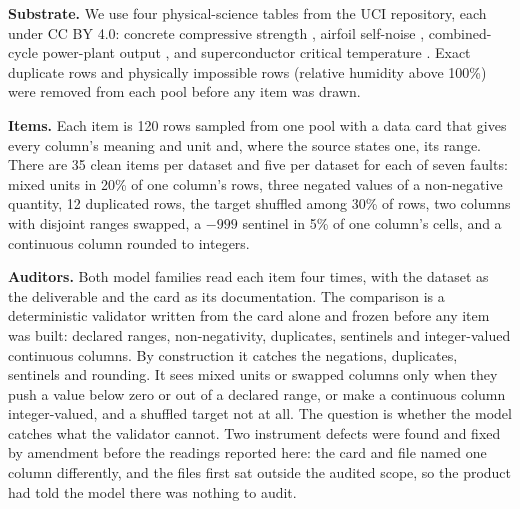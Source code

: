 \textbf{Substrate.} We use four physical-science tables from the UCI repository, each under CC BY 4.0:
concrete compressive strength \citep{yeh1998concrete}, airfoil self-noise
\citep{brooks1989airfoil}, combined-cycle power-plant output \citep{tufekci2014ccpp}, and
superconductor critical temperature \citep{hamidieh2018superconductor}. Exact duplicate rows and
physically impossible rows (relative humidity above 100\%) were removed from each pool before any
item was drawn.

\textbf{Items.} Each item is 120 rows sampled from one pool with a data card that gives every
column's meaning and unit and, where the source states one, its range. There are 35 clean items
per dataset and five per dataset for each of seven faults: mixed units in 20\% of one column's
rows, three negated values of a non-negative quantity, 12 duplicated rows, the target shuffled
among 30\% of rows, two columns with disjoint ranges swapped, a $-999$ sentinel in 5\% of one
column's cells, and a continuous column rounded to integers.

\textbf{Auditors.} Both model families read each item four times, with the dataset as the
deliverable and the card as its documentation. The comparison is a deterministic validator written
from the card alone and frozen before any item was built: declared ranges, non-negativity,
duplicates, sentinels and integer-valued continuous columns. By construction it catches the
negations, duplicates, sentinels and rounding. It sees mixed units or swapped columns only when
they push a value below zero or out of a declared range, or make a continuous column
integer-valued, and a shuffled target not at all. The question is whether the model catches
what the validator cannot. Two instrument defects were found and fixed by amendment before the
readings reported here: the card and file named one column differently, and the files first sat
outside the audited scope, so the product had told the model there was nothing to audit.

